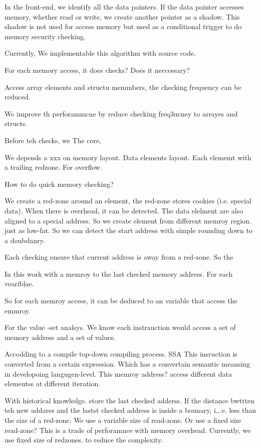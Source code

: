 In the front-end, we identify all the data pointers.
If the data pointer accesses memory, whether read or write, we create another pointer as a shadow.
This shadow is not used for access memory but used as a conditional trigger to do memory security checking.


Currently, We implementable this algorithm with source code.

For each memory access, it does checks?
Does it neccessary?

Access array elements and structu memmbers, the checking frequency can be reduced.

We improve th perforammcne by reduce checking freq3ucney to arrayes and structs.

Before teh checks, we
The core,

We depends a xxx on memory layout.
Data elements layout. Each elememt  with a trailing redzone.
For overflow.

How to do quick memory checking?

We create a red-zone around an element, the red-zone stores cookies (i.e. special data).
When there is overhead, it can be detected.
The data elelment are also aligned to a special address.
So we create element from different memroy region. just as low-fat.
So we can detect the start address with simple rounding down to a doubdanry.



Each checking ensure that current address is away from a red-zone.
So the


In this work with a memroy to the last checked memory address.
For each veariblae.

So for each memroy access, it can be deduced to an variable that access the emmroy.

For the value -set analsys. We know each instrauction would
access a set of memory address and a set of values.

Accodding to a compile top-down compiling process. SSA
This insruction is converted from a certain expression.
Which has a convertain semantic meansing in developoing langugen-level.
This memroy address?
access different data elementss at different iteration.

With historical knowledge. store the last checked adderss.
If the distance bwttten teh new addares and the lastst checked address is inside a bounary, i,..e. less than the size of
a red-zone.
We use a variable size of read-zone.
Or use a fixed size read-zone?
This is a trade of perforamnce with memory overhead. Currently, we use fixed size of redzones.
to reduce the complexity.

